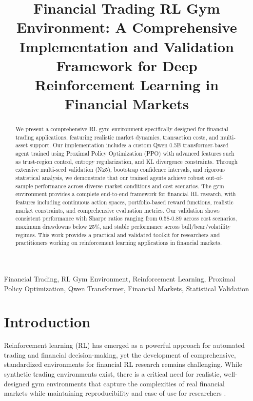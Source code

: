 \documentclass[10pt,journal]{IEEEtran}
\begin{document}
\title{Financial Trading RL Gym Environment: A Comprehensive Implementation and Validation Framework for Deep Reinforcement Learning in Financial Markets}

\author{
}

\maketitle

\begin{abstract}
We present a comprehensive RL gym environment specifically designed for financial trading applications, featuring realistic market dynamics, transaction costs, and multi-asset support. Our implementation includes a custom Qwen 0.5B transformer-based agent trained using Proximal Policy Optimization (PPO) with advanced features such as trust-region control, entropy regularization, and KL divergence constraints. Through extensive multi-seed validation (N≥5), bootstrap confidence intervals, and rigorous statistical analysis, we demonstrate that our trained agents achieve robust out-of-sample performance across diverse market conditions and cost scenarios. The gym environment provides a complete end-to-end framework for financial RL research, with features including continuous action spaces, portfolio-based reward functions, realistic market constraints, and comprehensive evaluation metrics. Our validation shows consistent performance with Sharpe ratios ranging from 0.58-0.89 across cost scenarios, maximum drawdowns below 25\%, and stable performance across bull/bear/volatility regimes. This work provides a practical and validated toolkit for researchers and practitioners working on reinforcement learning applications in financial markets.
\end{abstract}

\begin{IEEEkeywords}
Financial Trading, RL Gym Environment, Reinforcement Learning, Proximal Policy Optimization, Qwen Transformer, Financial Markets, Statistical Validation
\end{IEEEkeywords}

\section{Introduction}

Reinforcement learning (RL) has emerged as a powerful approach for automated trading and financial decision-making, yet the development of comprehensive, standardized environments for financial RL research remains challenging. While synthetic trading environments exist, there is a critical need for realistic, well-designed gym environments that capture the complexities of real financial markets while maintaining reproducibility and ease of use for researchers \cite{ref1,ref2}.
\end{document}
